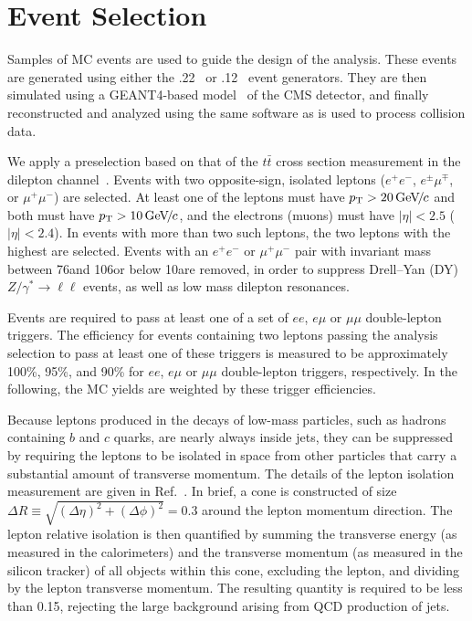 \section{Event Selection}
\label{sec:eventSel}

Samples of  MC events are used to  guide the  design of  the analysis.
These      events     are      generated     using      either     the
.22~\cite{Pythia}  or  .12~\cite{Madgraph} event
generators.    They   are   then   simulated  using   a   GEANT4-based
model~\cite{Geant} of the CMS  detector, and finally reconstructed and
analyzed using the same software as is used to process collision data.

We apply a  preselection   based  on  that of the $t\bar{t}$  cross section
measurement in  the dilepton channel~\cite{ref:top}.  Events
with     two     opposite-sign,     isolated    leptons     ($e^+e^-$,
$e^{\pm}\mu^{\mp}$, or $\mu^+\mu^-$) are selected. At least one of the leptons must
have  $p_{\mathrm{T}} >  20{\,\text{Ge\hspace{-.08em}V\hspace{-0.16em}/\hspace{-0.08em}}c}$ and  both must  have $p_{\mathrm{T}}  > 10{\,\text{Ge\hspace{-.08em}V\hspace{-0.16em}/\hspace{-0.08em}}c}$,  and the
electrons (muons) must have $|\eta| < 2.5$ ($|\eta| < 2.4$). In events
with more  than two such leptons,   the two  leptons with the
highest \pt are selected.  Events with an $e^+e^-$  or $\mu^+\mu^-$ pair
with  invariant mass  between 76\GeVcc  and  106\GeVcc or  below
10\GeVcc are removed, in  order      to     suppress     Drell--Yan  (DY)
$Z/\gamma^{*}\to\ell\ell$  events,  as  well  as   low  mass  dilepton
resonances.

Events are required to pass  at least one  of a set of $ee$, $e\mu$ or $\mu\mu$
double-lepton triggers.  The  efficiency for events containing two 
leptons passing the analysis selection to  pass at  least  one of  these
triggers  is measured to be approximately 100\%, 95\%, and 90\%
for $ee$, $e\mu$ or $\mu\mu$ double-lepton triggers, respectively.
In the following, the MC yields are weighted by these trigger efficiencies.

Because leptons produced in the  decays of low-mass particles, such as
hadrons containing $b$  and $c$ quarks,  are  nearly  always inside  jets,  they can  be
suppressed by requiring the leptons to be isolated in space from other
particles that carry a  substantial amount of transverse momentum. The
details   of   the  lepton   isolation   measurement   are  given   in
Ref.~\cite{ref:top}.   In  brief,   a cone is constructed     of  size
$\Delta{}R\equiv\sqrt{(\Delta\eta)^2+(\Delta\phi)^2}=0.3$  around  the
lepton  momentum  direction. The  lepton  relative  isolation is  then
quantified  by  summing the  transverse  energy  (as  measured in  the
calorimeters) and the transverse  momentum (as measured in the silicon
tracker) of  all objects  within this cone,  excluding the  lepton, and
dividing by  the lepton transverse momentum. The resulting quantity
is required to be  less than 0.15, rejecting
the large background arising from QCD production of jets.

